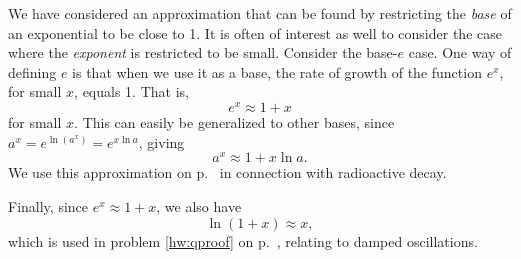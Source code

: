 We have considered an approximation that can be found by restricting the \emph{base} of
an exponential to be close to 1. It is often of interest as well to consider the case
where the \emph{exponent} is restricted to be small. Consider the base-$e$ case. One
way of defining $e$ is that when we use it as a base, the rate of growth of the function
$e^x$, for small $x$, equals 1. That is,
\begin{equation*}
  e^x \approx 1+x
\end{equation*}
for small $x$. This can easily be generalized to other bases, since $a^x=e^{\ln(a^x)}=e^{x\ln a}$,
giving
\begin{equation*}
  a^x \approx 1+x\ln a.
\end{equation*}
We use this approximation on p.~\pageref{rate-of-decay-approx} in connection with radioactive decay.

Finally, since $e^x \approx 1+x$, we also have
\begin{equation*}
  \ln(1+x) \approx x,
\end{equation*}
which is used in problem \ref{hw:qproof} on p.~\pageref{hw:qproof}, relating to damped oscillations.
